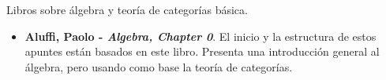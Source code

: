 \documentclass[11pt]{article}
\theoremstyle{plain}
\theoremstyle{definition}
\theoremstyle{remark}
\begin{document}
Libros sobre álgebra y teoría de categorías básica.

\begin{itemize}
\item \textbf{Aluffi, Paolo - \emph{Algebra, Chapter 0}}. El inicio y la estructura de
estos apuntes están basados en este libro. Presenta una introducción
general al álgebra, pero usando como base la teoría de categorías.
\end{itemize}



\end{document}
